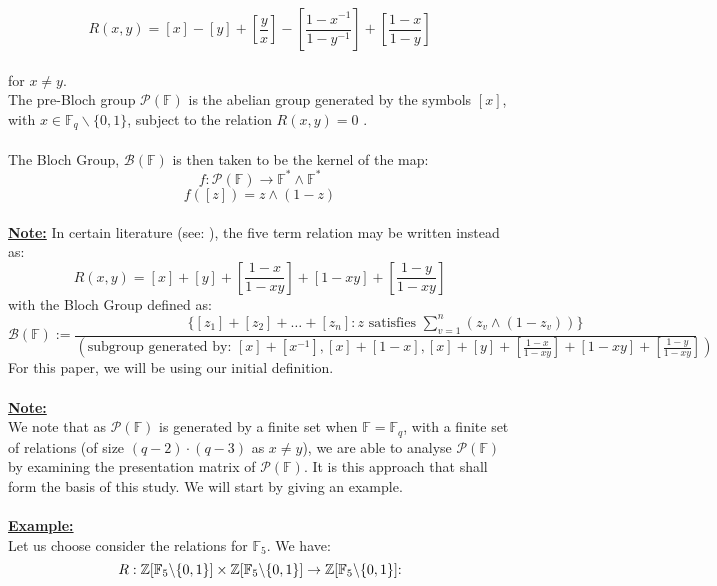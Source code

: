 \documentclass[11pt]{article}
\theoremstyle{plain}
\theoremstyle{definition}
\begin{document}
\begin{equation*}
R(x,y) = [x] - [y] + [\frac{y}{x}] - [\frac{1-x^{-1}}{1-y^{-1}}] + [\frac{1-x}{1-y}] \label{equation:R Formula }
\end{equation*}
\\
for $x \neq y$.\\ The pre-Bloch group $\mathcal{P}(\mathbb{F})$ is the abelian group generated by the symbols $[x]$, with $x \in \mathbb{F}_{q}  \backslash \{0,1\}$, subject to the relation $R(x,y)=0$  \cite{DUPONT1982159}.\\
\\
The Bloch Group, $\mathcal{B}(\mathbb{F})$ is then taken to be the kernel of the map:
\begin{equation*}
f: \mathcal{P}(\mathbb{F}) \rightarrow \mathbb{F}^* \wedge \mathbb{F}^*
\end{equation*}
\begin{equation*}
f([z]) = z \wedge (1-z)
\end{equation*}
\\
\textbf{\underline{Note:}} In certain literature (see: \cite{Zagier2007}), the five term relation may be written instead as:
\begin{equation*}
R(x,y)= [x] + [y] + [\frac{1-x}{1-xy}]+[1-xy] + [\frac{1-y}{1-xy}] 
\end{equation*}
with the Bloch Group defined as:
\begin{equation*}
\mathcal{B}(\mathbb{F}) := \frac{\{[z_1] + [z_2] + \ldots +[z_n] : z \text{ satisfies } \sum\limits_{v=1}^{n} (z_v \wedge (1-z_v)) \}}{(\text{subgroup generated by: } [x] + [x^{-1}], [x] + [1-x], [x] + [y] + [\frac{1-x}{1-xy}]+[1-xy] + [\frac{1-y}{1-xy}] )}
\end{equation*}
For this paper, we will be using our initial definition. \\ 
\\
\textbf{\underline{Note:}}\\
We note that as $\mathcal{P}(\mathbb{F})$ is generated by a finite set when $\mathbb{F} = \mathbb{F}_q$, with a finite set of relations (of size $(q-2)\cdot (q-3)$ as $x \neq y$), we are able to analyse $\mathcal{P}(\mathbb{F})$ by examining the presentation matrix of $\mathcal{P}(\mathbb{F})$. It is this approach that shall form the basis of this study. We will start by giving an example. \\
\\ 
\textbf{\underline{Example:}} \\Let us choose consider the relations for $\mathbb{F}_5$. We have: \\
\begin{equation*}
R:  \mathbb{Z}[\mathbb{F}_{5}  \backslash \{0,1\}] \times\mathbb{Z}[ \mathbb{F}_{5}  \backslash \{0,1\}] \rightarrow \mathbb{Z} [\mathbb{F}_{5}  \backslash \{0,1\}] \text:
\end{equation*}
\end{document}
